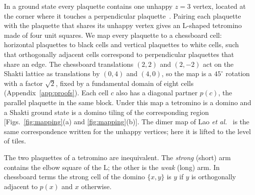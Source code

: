 \documentclass[aps,prb,twocolumn,floatfix,longbibliography]{revtex4-2}
\begin{document}
In a ground state every plaquette contains one unhappy $z=3$ vertex, located at the corner where it touches a perpendicular plaquette~\cite{Morrison2013,Chern2013,Lao2018}. Pairing each plaquette with the plaquette that shares its unhappy vertex gives an L-shaped tetromino made of four unit squares. We map every plaquette to a chessboard cell: horizontal plaquettes to black cells and vertical plaquettes to white cells, such that orthogonally adjacent cells correspond to perpendicular plaquettes that share an edge. The chessboard translations $(2,2)$ and $(2,-2)$ act on the Shakti lattice as translations by $(0,4)$ and $(4,0)$, so the map is a $45^\circ$ rotation with a factor $\sqrt2$, fixed by a fundamental domain of eight cells (Appendix~\ref{app:proofs}). Each cell $c$ also has a diagonal partner $p(c)$, the parallel plaquette in the same block. Under this map a tetromino is a domino and a Shakti ground state is a domino tiling of the corresponding region [Figs.~\ref{fig:mapping}(a) and \ref{fig:mapping}(b)]. The dimer map of Lao \emph{et al.}~\cite{Lao2018} is the same correspondence written for the unhappy vertices; here it is lifted to the level of tiles.

The two plaquettes of a tetromino are inequivalent. The \emph{strong} (short) arm contains the elbow square of the L; the other is the \emph{weak} (long) arm. In chessboard terms the strong cell of the domino $\{x,y\}$ is $y$ if $y$ is orthogonally adjacent to $p(x)$ and $x$ otherwise.
\end{document}
